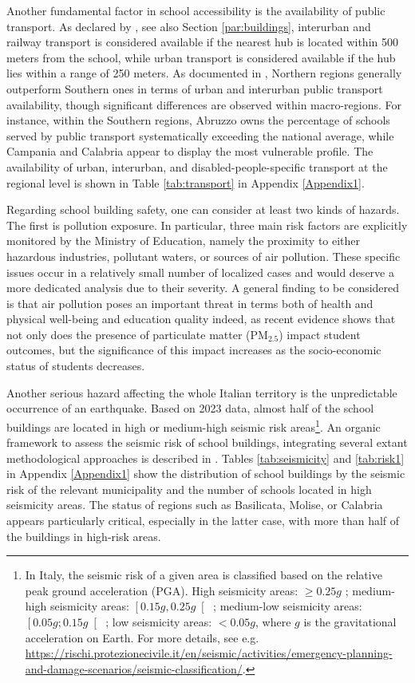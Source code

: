 \documentclass{book}
\begin{document}
Another fundamental factor in school accessibility is the availability of public transport. As declared by \cite{MIUR}, see also Section \ref{par:buildings}, interurban and railway transport is considered available if the nearest hub is located within 500 meters from the school, while urban transport is considered available if the hub lies within a range of 250 meters. As documented in \cite{Garlaschi}, Northern regions generally outperform Southern ones in terms of urban and interurban public transport availability, though significant differences are observed within macro-regions. For instance, within the Southern regions, Abruzzo owns the percentage of schools served by public transport systematically exceeding the national average, while Campania and Calabria appear to display the most vulnerable profile. The availability of urban, interurban, and disabled-people-specific transport at the regional level is shown in Table \ref{tab:transport} in Appendix \ref{Appendix1}.

Regarding school building safety, one can consider at least two kinds of hazards. The first is pollution exposure. In particular, three main risk factors are explicitly monitored by the Ministry of Education, namely the proximity to either hazardous industries, pollutant waters, or sources of air pollution. These specific issues occur in a relatively small number of localized cases and would deserve a more dedicated analysis due to their severity. A general finding to be considered is that air pollution poses an important threat in terms both of health and physical well-being and education quality indeed, as recent evidence \citep{AQInvalsi} shows that not only does the presence of particulate matter (PM$_{2.5}$)  impact student outcomes, but the significance of this impact increases as the socio-economic status of students decreases.

Another serious hazard affecting the whole Italian territory is the unpredictable occurrence of an earthquake. Based on 2023 data, almost half of the school buildings are located in high or medium-high seismic risk areas\footnote{In Italy, the seismic risk of a given area is classified based on the relative peak ground acceleration (PGA). High seismicity areas: $\geq 0.25 g$ ; medium-high seismicity areas: $\left[ 0.15g, 0.25 g \right[$ ; medium-low seismicity areas: $\left[ 0.05g; 0.15 g \right[$ ; low seismicity areas: $< 0.05 g$, where $g$ is the gravitational acceleration on Earth. For more details, see e.g. \url{https://rischi.protezionecivile.it/en/seismic/activities/emergency-planning-and-damage-scenarios/seismic-classification/}.}. An organic framework to assess the seismic risk of school buildings, integrating several extant methodological approaches is described in \cite{MARS}. Tables \ref{tab:seismicity} and \ref{tab:risk1} in Appendix \ref{Appendix1} show the distribution of school buildings by the seismic risk of the relevant municipality and the number of schools located in high seismicity areas. The status of regions such as Basilicata, Molise, or Calabria appears particularly critical, especially in the latter case, with more than half of the buildings in high-risk areas. 
\end{document}
